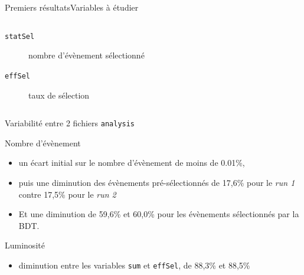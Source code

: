 \documentclass[9pt]{beamer}
\begin{document}
\begin{frame}{Premiers résultats}{Variables à étudier}
\begin{columns}
\begin{column}{0.65\textwidth}
\begin{description}
				\item[\texttt{statSel}] nombre d'évènement sélectionné
				\item[\texttt{effSel}] taux de sélection
			\end{description}
        \end{column}
        
        \begin{column}{0.4\textwidth}
			
        \end{column}
        
    \end{columns}

\end{frame}


\begin{frame}{Variabilité entre 2 fichiers \texttt{analysis}}

	
	
	\begin{block}{Nombre d'évènement} 
	
	\begin{itemize}
	\item un écart initial sur le nombre d'évènement de moins de 0.01\%, 
	\item puis une diminution des évènements pré-sélectionnés de 17,6\% pour le \textit{run 1} contre 17,5\% pour le \textit{run 2}
	\item Et une diminution de 59,6\% et 60,0\% pour les évènements sélectionnés par la BDT. 
	\end{itemize}	
	\end{block}
	
	
	
	\begin{block}{Luminosité} 
	
	\begin{itemize}
		\item diminution entre les variables \texttt{sum} et \texttt{effSel}, de 88,3\% et 88,5\%	\end{itemize}
	
	\end{block}
	
	
	

\end{frame}
\end{document}
